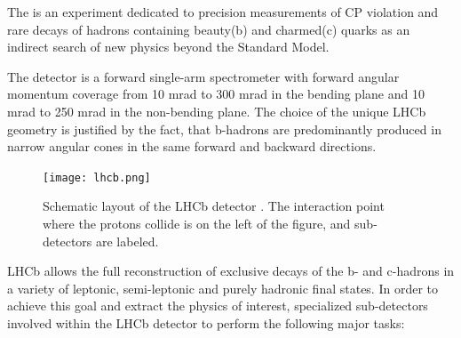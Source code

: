 The \lhcb is an experiment dedicated to precision measurements of CP violation
and rare decays of hadrons containing  beauty(b) and charmed(c) quarks as
an indirect search of new physics beyond the Standard Model.

The \lhcb detector is a forward single-arm spectrometer with forward angular
momentum coverage from 10 mrad to 300 mrad in the bending plane and 10 mrad to
250 mrad in the non-bending plane. The choice of the unique LHCb geometry is
justified by the fact, that b-hadrons are predominantly produced in narrow
angular cones in the same forward and backward directions.

\begin{figure}[tb]
\begin{center}
\texttt{[image: lhcb.png]}
\end{center}
\caption{\small Schematic layout of the LHCb detector \cite{Alves:2008zz}. 
The interaction point where the protons collide is on the left of the figure, 
and sub-detectors are labeled.}
\label{fig:lhcb}
\end{figure}

LHCb allows the full reconstruction of exclusive decays of the b- and c-hadrons
in a variety of leptonic, semi-leptonic and purely hadronic final states. 
In order to achieve this goal and extract the physics of interest, 
specialized sub-detectors involved within the LHCb detector to perform the 
following major tasks:

